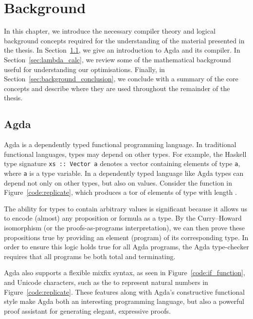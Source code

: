 \chapter{Background}
\label{cha:background}



In this chapter, we introduce the necessary compiler theory and logical background concepts required for the understanding of the material presented in the thesis. In Section~\ref{sec:agda}, we give an introduction to Agda and its compiler. In Section~\ref{sec:lambda_calc}, we review some of the mathematical background useful for understanding our optimisations. Finally, in Section~\ref{sec:background_conclusion}, we conclude with a summary of the core concepts and describe where they are used throughout the remainder of the thesis.

\section{Agda}
\label{sec:agda}

Agda is a dependently typed functional programming language. In traditional functional languages, types may depend on other types. For example, the Haskell type signature \lstinline{xs :: Vector a} denotes a vector containing elements of type \lstinline{a}, where \lstinline{a} is a type variable. In a dependently typed language like Agda types can depend not only on other types, but also on values. Consider the  function in Figure~\ref{code:replicate}, which produces a tor of elements of type  with length .\cite{norell2009}



The ability for types to contain arbitrary values is significant because it allows us to encode (almost) any proposition or formula as a type. By the Curry–Howard isomorphism (or the proofs-as-programs interpretation), we can then prove these propositions true by providing an element (program) of its corresponding type.\cite{poernomo2005} In order to ensure this logic holds true for all Agda programs, the Agda type-checker requires that all programs be both total and terminating.\cite{norell2009}

Agda also supports a flexible mixfix syntax, as seen in Figure~\ref{code:if_function}, and Unicode characters, such as the  to represent natural numbers in Figure~\ref{code:replicate}. These features along with Agda's constructive functional style make Agda both an interesting programming language, but also a powerful proof assistant for generating elegant, expressive proofs.

